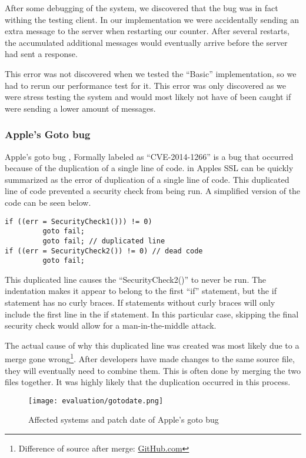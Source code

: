 After some debugging of the system, we discovered that the bug was in fact withing the testing client. In our implementation we were accidentally sending an extra message to the server when restarting our counter. After several restarts, the accumulated additional messages would eventually arrive before the server had sent a response.

This error was not discovered when we tested the ``Basic'' implementation, so we had to rerun our performance test for it. This error was only discovered as we were stress testing the system and would most likely not have of been caught if were sending a lower amount of messages.

\subsubsection{Apple's Goto bug}
Apple's goto bug , Formally labeled as ``CVE-2014-1266'' \cite{bland2014finding} is a bug that occurred because of the duplication of a single line of code.  in Apples SSL can be quickly summarized as the error of duplication of a single line of code. This duplicated line of code prevented a security check from being run. A simplified version of the code can be seen below.

\begin{lstlisting}[style=myScalastyle]
if ((err = SecurityCheck1())) != 0)
         goto fail;
         goto fail; // duplicated line
if ((err = SecurityCheck2()) != 0) // dead code
         goto fail;
\end{lstlisting}

This duplicated line causes the ``SecurityCheck2()'' to never be run. The indentation makes it appear to belong to the first ``if'' statement, but the if statement has no curly braces. If statements without curly braces will only include the first line in the if statement.  In this particular case, skipping the final security check would allow for a man-in-the-middle attack.

The actual cause of why this duplicated line was created was most likely due to a merge gone wrong\footnote{Difference of source after merge: \href{https://gist.github.com/hongrich/9176925}{GitHub.com}}. After developers have made changes to the same source file, they will eventually need to combine them. This is often done by merging the two files together. It was highly likely that the duplication occurred in this process.
\begin{figure}[H]
  \centering
  \texttt{[image: evaluation/gotodate.png]}
  \caption{Affected systems and patch date of Apple's goto bug \cite{bland2014finding}}
  \label{fig:gotofail}
\end{figure}

